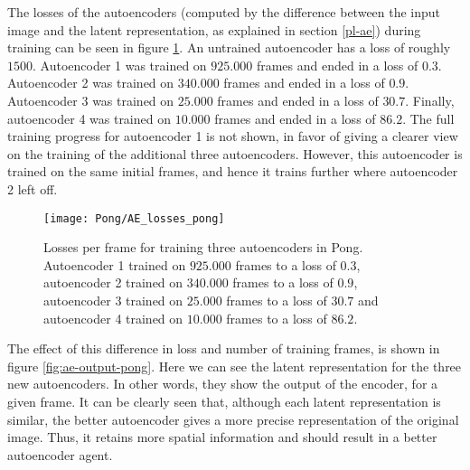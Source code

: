 The losses of the autoencoders (computed by the difference between the input image and the latent representation, as explained in section \ref{pl-ae}) during training can be seen in figure \ref{fig:ae-loss-pong}. An untrained autoencoder has a loss of roughly $1500$. Autoencoder 1 was trained on $925.000$ frames and ended in a loss of $0.3$. Autoencoder 2 was trained on $340.000$ frames and ended in a loss of $0.9$. Autoencoder 3 was trained on $25.000$ frames and ended in a loss of $30.7$. Finally, autoencoder 4 was trained on $10.000$ frames and ended in a loss of $86.2$. The full training progress for autoencoder 1 is not shown, in favor of giving a clearer view on the training of the additional three autoencoders. However, this autoencoder is trained on the same initial frames, and hence it trains further where autoencoder 2 left off.

\begin{figure}[h]
    \centering
   	\texttt{[image: Pong/AE\_losses\_pong]}
    	\caption{Losses per frame for training three autoencoders in Pong. Autoencoder 1 trained on $925.000$ frames to a loss of $0.3$, autoencoder 2 trained on $340.000$ frames to a loss of $0.9$, autoencoder 3 trained on $25.000$ frames to a loss of $30.7$ and autoencoder 4 trained on $10.000$ frames to a loss of $86.2$.}
    	\label{fig:ae-loss-pong}
\end{figure}

The effect of this difference in loss and number of training frames, is shown in figure \ref{fig:ae-output-pong}. Here we can see the latent representation for the three new autoencoders. In other words, they show the output of the encoder, for a given frame. It can be clearly seen that, although each latent representation is similar, the better autoencoder gives a more precise representation of the original image. Thus, it retains more spatial information and should result in a better autoencoder agent.

